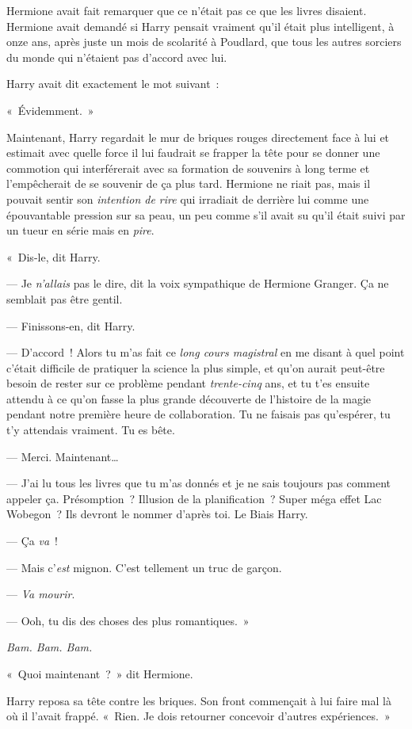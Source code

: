 Hermione avait fait remarquer que ce n'était pas ce que les livres disaient. Hermione avait demandé si Harry pensait vraiment qu'il était plus intelligent, à onze ans, après juste un mois de scolarité à Poudlard, que tous les autres sorciers du monde qui n'étaient pas d'accord avec lui.

Harry avait dit exactement le mot suivant~:

«~Évidemment.~»

Maintenant, Harry regardait le mur de briques rouges directement face à lui et estimait avec quelle force il lui faudrait se frapper la tête pour se donner une commotion qui interférerait avec sa formation de souvenirs à long terme et l'empêcherait de se souvenir de ça plus tard. Hermione ne riait pas, mais il pouvait sentir son \emph{intention de rire} qui irradiait de derrière lui comme une épouvantable pression sur sa peau, un peu comme s'il avait su qu'il était suivi par un tueur en série mais en \emph{pire}.

«~Dis-le, dit Harry.

--- Je \emph{n'allais} pas le dire, dit la voix sympathique de Hermione Granger. Ça ne semblait pas être gentil.

--- Finissons-en, dit Harry.

--- D'accord~! Alors tu m'as fait ce \emph{long cours magistral} en me disant à quel point c'était difficile de pratiquer la science la plus simple, et qu'on aurait peut-être besoin de rester sur ce problème pendant \emph{trente-cinq} ans, et tu t'es ensuite attendu à ce qu'on fasse la plus grande découverte de l'histoire de la magie pendant notre première heure de collaboration. Tu ne faisais pas qu'espérer, tu t'y attendais vraiment. Tu es bête.

--- Merci. Maintenant…

--- J'ai lu tous les livres que tu m'as donnés et je ne sais toujours pas comment appeler ça. Présomption~? Illusion de la planification~? Super méga effet Lac Wobegon~? Ils devront le nommer d'après toi. Le Biais Harry.

--- Ça \emph{va}~!

--- Mais c'\emph{est} mignon. C'est tellement un truc de garçon.

--- \emph{Va mourir}.

--- Ooh, tu dis des choses des plus romantiques.~»

\emph{Bam. Bam. Bam.}

«~Quoi maintenant~?~» dit Hermione.

Harry reposa sa tête contre les briques. Son front commençait à lui faire mal là où il l'avait frappé. «~Rien. Je dois retourner concevoir d'autres expériences.~»

